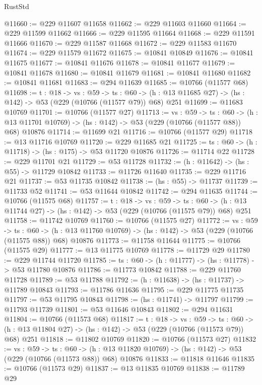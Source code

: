 \begin{lexlean}{RustStd}
\begin{coremodule}
@11660 := @229 @11607 @11658
@11662 := @229 @11603 @11660
@11664 := @229 @11599 @11662
@11666 := @229 @11595 @11664
@11668 := @229 @11591 @11666
@11670 := @229 @11587 @11668
@11672 := @229 @11583 @11670
@11674 := @229 @11579 @11672
@11675 := @10841 @10849
@11676 := @10841 @11675
@11677 := @10841 @11676
@11678 := @10841 @11677
@11679 := @10841 @11678
@11680 := @10841 @11679
@11681 := @10841 @11680
@11682 := @10841 @11681
@11683 := @294 @11639
@11685 := @10766 (@11577 @68)
@11698 := {t : @18} ->
  {vs : @59} ->
  {ts : @60} -> (h : @13 @11685 @27) -> (hs : @142) -> @53 (@229 (@10766 (@11577 @79)) @68) @251
@11699 := @11683 @10769
@11701 := @10766 (@11577 @27)
@11713 := {vs : @59} ->
  {ts : @60} ->
  (h : @13 @11701 @10769) -> (hs : @142) -> @53 (@229 (@10766 (@11577 @88)) @68) @10876
@11714 := @11699 @21
@11716 := @10766 (@11577 @29)
@11718 := @13 @11716 @10769
@11720 := @229 @11685 @21
@11725 := {ts : @60} -> (h : @11718) -> (hs : @175) -> @53 @11720 @10876
@11726 := @11714 @22
@11728 := @229 @11701 @21
@11729 := @53 @11728
@11732 := (h : @11642) -> (hs : @55) -> @11729 @10842
@11733 := @11726 @11640
@11735 := @229 @11716 @21
@11737 := @53 @11735 @10842
@11738 := (hs : @55) -> @11737
@11739 := @11733 @52
@11741 := @53 @11644 @10842
@11742 := @294 @11635
@11744 := @10766 (@11575 @68)
@11757 := {t : @18} ->
  {vs : @59} ->
  {ts : @60} -> (h : @13 @11744 @27) -> (hs : @142) -> @53 (@229 (@10766 (@11575 @79)) @68) @251
@11758 := @11742 @10769
@11760 := @10766 (@11575 @27)
@11772 := {vs : @59} ->
  {ts : @60} ->
  (h : @13 @11760 @10769) -> (hs : @142) -> @53 (@229 (@10766 (@11575 @88)) @68) @10876
@11773 := @11758 @11644
@11775 := @10766 (@11575 @29)
@11777 := @13 @11775 @10769
@11778 := @11729 @29
@11780 := @229 @11744 @11720
@11785 := {ts : @60} -> (h : @11777) -> (hs : @11778) -> @53 @11780 @10876
@11786 := @11773 @10842
@11788 := @229 @11760 @11728
@11789 := @53 @11788
@11792 := (h : @11638) -> (hs : @11737) -> @11789 @10843
@11793 := @11786 @11636
@11795 := @229 @11775 @11735
@11797 := @53 @11795 @10843
@11798 := (hs : @11741) -> @11797
@11799 := @11793 @11739
@11801 := @53 @11646 @10843
@11802 := @294 @11631
@11804 := @10766 (@11573 @68)
@11817 := {t : @18} ->
  {vs : @59} ->
  {ts : @60} -> (h : @13 @11804 @27) -> (hs : @142) -> @53 (@229 (@10766 (@11573 @79)) @68) @251
@11818 := @11802 @10769
@11820 := @10766 (@11573 @27)
@11832 := {vs : @59} ->
  {ts : @60} ->
  (h : @13 @11820 @10769) -> (hs : @142) -> @53 (@229 (@10766 (@11573 @88)) @68) @10876
@11833 := @11818 @11646
@11835 := @10766 (@11573 @29)
@11837 := @13 @11835 @10769
@11838 := @11789 @29

\end{coremodule}
\end{lexlean}
